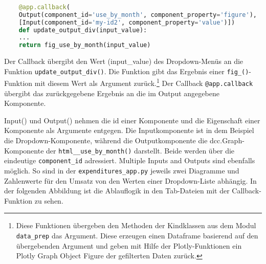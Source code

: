     \begin{lstlisting}[language=Python, caption={html\_fig\_total\_expnd()}]        
    
    @app.callback(
    Output(component_id='use_by_month', component_property='figure'),
    [Input(component_id='my-id2', component_property='value')])
    def update_output_div(input_value):
    ...
    return fig_use_by_month(input_value)
    \end{lstlisting}


 
    Der Callback übergibt den Wert (input\_value) des Dropdown-Menüs an die Funktion \texttt{update\_output\_div()}. 
    Die Funktion gibt das Ergebnis einer \texttt{fig\_()}-Funktion mit diesem Wert als Argument zurück.\footnote{Diese Funktionen übergeben den Methoden der Kindklassen aus dem Modul \texttt{data\_prep} das Argument. 
    Diese erzeugen einen Dataframe basierend auf den übergebenden Argument und geben mit Hilfe der Plotly-Funktionen ein Plotly Graph Object Figure der gefilterten Daten zurück.}
    Der Callback \texttt{@app.callback} übergibt das zurückgegebene Ergebnis an die im Output angegebene Komponente.
    
    Input() und Output() nehmen die id einer Komponente und die Eigenschaft einer Komponente als Argumente entgegen.
    Die Inputkomponente ist in dem Beispiel die Dropdown-Komponente, während die Outputkomponente die dcc.Graph-Komponente der
    \texttt{html\_\_use\_by\_month()} darstellt. Beide werden über die eindeutige \texttt{component\_id} adressiert.
    Multiple Inputs and Outputs sind ebenfalls möglich. So sind in der \texttt{expenditures\_app.py}
    jeweils zwei Diagramme und Zahlenwerte für den Umsatz von den Werten einer Dropdown-Liste abhängig.
    In der folgenden Abbildung ist die Ablauflogik in den Tab-Dateien mit der Callback-Funktion zu sehen.

